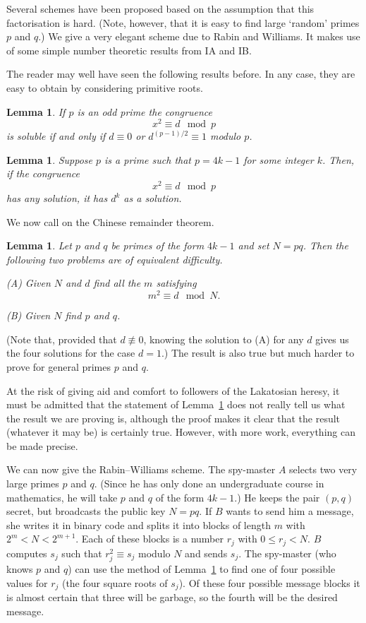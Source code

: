 \documentclass[12pt,a4paper]{article}
\theoremstyle{plain}
\newtheorem{lemma}[theorem]{Lemma}
\theoremstyle{definition}
\begin{document}
    \noindent
    Several schemes have been proposed based on the
    assumption that this factorisation is hard.
    (Note, however, that it is easy to find large `random'
    primes $p$ and $q$.) We give a very elegant
    scheme due to Rabin and Williams. It makes use
    of some simple number theoretic
    results from IA and IB.

    The reader may well have seen the following results
    before.
    In any case, they are
    easy to obtain by considering primitive
    roots.
    \begin{lemma}
        If $p$ is an odd prime the congruence
        \[x^{2}\equiv d\mod{p}\]
        is soluble if and only if $d\equiv 0$ or
        $d^{(p-1)/2}\equiv 1$ modulo $p$.
    \end{lemma}
    \begin{lemma}
        Suppose $p$ is a prime such that
        $p=4k-1$ for some integer $k$. Then, if the congruence
        \[x^{2}\equiv d\mod{p}\]
        has any solution, it has $d^{k}$ as a solution.
    \end{lemma}
    We now call on the Chinese remainder theorem.
    \begin{lemma}
        \label{square root}
        Let $p$ and $q$ be primes of the
        form $4k-1$ and set $N=pq$.
        Then the following two problems are of equivalent
        difficulty.

        (A) Given $N$ and $d$ find all the $m$ satisfying
        \[m^{2}\equiv d\mod{N}.\]

        (B) Given $N$ find $p$ and $q$.
    \end{lemma}
    \noindent
    (Note that, provided that $d\not\equiv 0$,
    knowing the solution to (A) for any $d$
    gives us the four solutions for the case $d=1$.)
    The result is also true but much harder
    to prove for general primes $p$ and $q$.


    At the risk of giving aid and comfort
    to followers of the
    Lakatosian heresy, it must be admitted that
    the statement of Lemma~\ref{square root}
    does not really tell us what the result
    we are proving is,
    although the proof makes it clear
    that the result (whatever it may be) is certainly
    true. However, with more work, everything can be
    made precise.

    We can now give the Rabin--Williams scheme.
    The spy-master $A$ selects two very large
    primes $p$ and $q$. (Since he has only done
    an undergraduate course in mathematics,
    he will take $p$ and $q$ of the form $4k-1$.)
    He keeps the pair $(p,q)$ secret, but broadcasts
    the public key $N=pq$. If $B$ wants to
    send him a message, she writes it in binary code and
    splits it into blocks of length $m$ with
    $2^{m}<N<2^{m+1}$. Each of these blocks
    is a number $r_{j}$ with $0\leq r_{j}<N$.
    $B$ computes $s_{j}$ such that $r_{j}^{2}\equiv s_{j}$
    modulo $N$ and sends $s_{j}$. The spy-master
    (who knows $p$ and $q$) can use the
    method of Lemma~\ref{square root} to find
    one of four possible values for $r_{j}$
    (the four square roots of $s_{j}$).
    Of these four possible message blocks
    it is almost
    certain that three will be garbage, so
    the fourth will be the desired message.
\end{document}
